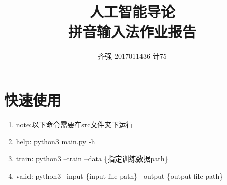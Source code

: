 \documentclass[]{article}
\title{人工智能导论\\ 拼音输入法作业报告}
\author{齐强 2017011436 计75}
\begin{document}
\maketitle
\tableofcontents
\newpage

\section{快速使用}
\begin{enumerate}
    \item note:以下命令需要在src文件夹下运行
    \item help: python3 main.py -h
    \item train: python3 --train --data \{指定训练数据path\}
    \item valid: python3 --input \{input file path\} --output \{output file path\}
\end{enumerate}
\end{document}
